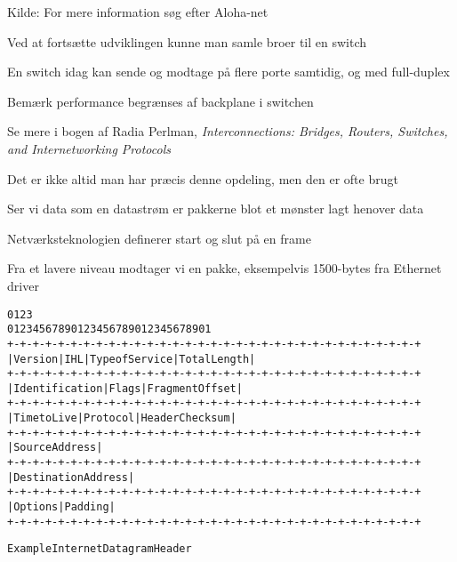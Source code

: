 \documentclass[Screen16to9,17pt]{foils}
\begin{document}
Kilde: For mere information søg efter Aloha-net\\ 



\begin{list1}
\item Ved at fortsætte udviklingen kunne man samle broer til en switch
\item En switch idag kan sende og modtage på flere porte samtidig, og med full-duplex
\item Bemærk performance begrænses af backplane i switchen
\end{list1}



Se mere i bogen af Radia Perlman, \emph{Interconnections: Bridges, Routers, Switches, and Internetworking Protocols}



\centerline{Det er ikke altid man har præcis denne opdeling, men den er ofte brugt}


\begin{list1}
\item Ser vi data som en datastrøm er pakkerne blot et mønster lagt henover data
\item Netværksteknologien definerer start og slut på en frame
\item Fra et lavere niveau modtager vi en pakke, eksempelvis 1500-bytes fra Ethernet driver
\end{list1}


\begin{alltt}
\small
    0                   1                   2                   3
    0 1 2 3 4 5 6 7 8 9 0 1 2 3 4 5 6 7 8 9 0 1 2 3 4 5 6 7 8 9 0 1
   +-+-+-+-+-+-+-+-+-+-+-+-+-+-+-+-+-+-+-+-+-+-+-+-+-+-+-+-+-+-+-+-+
   |Version|  IHL  |Type of Service|          Total Length         |
   +-+-+-+-+-+-+-+-+-+-+-+-+-+-+-+-+-+-+-+-+-+-+-+-+-+-+-+-+-+-+-+-+
   |         Identification        |Flags|      Fragment Offset    |
   +-+-+-+-+-+-+-+-+-+-+-+-+-+-+-+-+-+-+-+-+-+-+-+-+-+-+-+-+-+-+-+-+
   |  Time to Live |    Protocol   |         Header Checksum       |
   +-+-+-+-+-+-+-+-+-+-+-+-+-+-+-+-+-+-+-+-+-+-+-+-+-+-+-+-+-+-+-+-+
   |                       Source Address                          |
   +-+-+-+-+-+-+-+-+-+-+-+-+-+-+-+-+-+-+-+-+-+-+-+-+-+-+-+-+-+-+-+-+
   |                    Destination Address                        |
   +-+-+-+-+-+-+-+-+-+-+-+-+-+-+-+-+-+-+-+-+-+-+-+-+-+-+-+-+-+-+-+-+
   |                    Options                    |    Padding    |
   +-+-+-+-+-+-+-+-+-+-+-+-+-+-+-+-+-+-+-+-+-+-+-+-+-+-+-+-+-+-+-+-+

                    Example Internet Datagram Header
\end{alltt}
\end{document}
